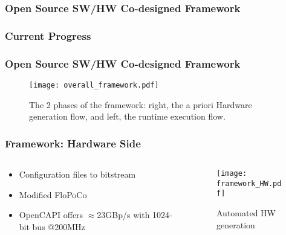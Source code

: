 \subsubsection{Open Source SW/HW Co-designed Framework}
\begin{frame}
    \frametitle{Current Progress}

    \tableofcontents[currentsection,
                     subsectionstyle=show/shaded/hide,
                     sectionstyle=show/hide]

\end{frame}

\begin{frame}
    \frametitle{Open Source SW/HW Co-designed Framework}
    \begin{figure}
      \centering
      \texttt{[image: overall\_framework.pdf]}
      \caption{The 2 phases of the framework: right, the a priori Hardware generation flow, and left, the runtime execution flow.}
    \end{figure}

\end{frame}


\begin{frame}
    \frametitle{Framework: Hardware Side}

    \begin{columns}

    \begin{column}{0.5\textwidth} %
        \begin{itemize} %
	    \item<1-> Configuration files to bitstream
	    \item<1-> Modified FloPoCo~\cite{flopoco1}
            \item<1-> OpenCAPI offers $\approx$23GBp/s with 1024-bit bus @200MHz
        \end{itemize}
    \end{column}

    \begin{column}{0.5\textwidth}
        \begin{figure}
            \centering
            \texttt{[image: framework\_HW.pdf]}
            \caption{Automated HW generation}
        \end{figure}
    \end{column}

    \end{columns}


\end{frame}

